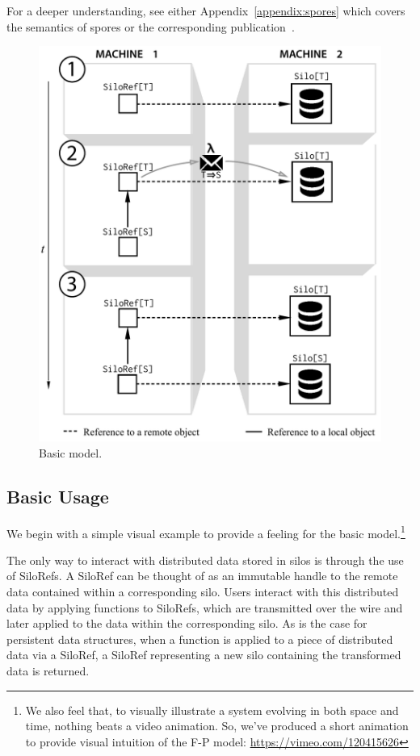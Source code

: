 \documentclass[preprint]{sigplanconf}
\theoremstyle{definition}
\theoremstyle{definition}
\begin{document}
For a deeper understanding, see either Appendix~\ref{appendix:spores} which
covers the semantics of spores or the corresponding publication~\cite{Spores}.

\begin{figure}[t!]
\centering\includegraphics[width=0.8\columnwidth]{basic-diagram.pdf}
\caption{Basic model.}\label{fig:basic-diagram}
\end{figure}

\subsection{Basic Usage}

We begin with a simple visual example to provide a feeling for the basic
model.\footnote{We also feel that, to visually illustrate a system evolving in
both space and time, nothing beats a video animation. So, we've produced a
short animation to provide visual intuition of the F-P model:
\url{https://vimeo.com/120415626}}

The only way to interact with distributed data stored in silos is through the
use of SiloRefs. A SiloRef can be thought of as an immutable handle to the
remote data contained within a corresponding silo. Users interact with this
distributed data by applying functions to SiloRefs, which are transmitted over
the wire and later applied to the data within the corresponding silo. As is
the case for persistent data structures, when a function is applied to a piece
of distributed data via a SiloRef, a SiloRef representing a new silo
containing the transformed data is returned.
\end{document}
